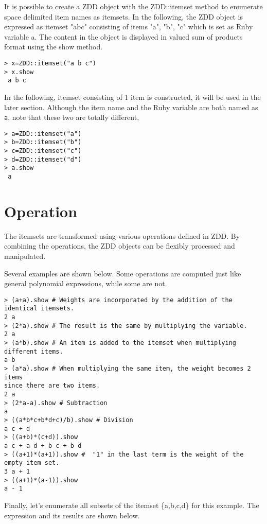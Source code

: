 It is possible to create a ZDD object with the ZDD::itemset method to enumerate space delimited item names as itemsets. In the following, the ZDD object is expressed as itemset "abc" consisting of items "a", "b", "c" which is set as Ruby variable a. The content in the object is displayed in valued sum of products format using the show method.

\begin{Verbatim}[baselinestretch=0.7,frame=single]
> x=ZDD::itemset("a b c")
> x.show
 a b c
\end{Verbatim}

In the following, itemset consisting of 1 item is constructed, it will be used in the later section. Although the item name and the Ruby variable are both named as \verb|a|,  note that these two are totally different, 

\begin{Verbatim}[baselinestretch=0.7,frame=single]
> a=ZDD::itemset("a")
> b=ZDD::itemset("b")
> c=ZDD::itemset("c")
> d=ZDD::itemset("d")
> a.show
 a
\end{Verbatim}

\section{Operation\label{sect:tut_ope}}
 The itemsets are transformed using various operations defined in ZDD. By combining the operations, the ZDD objects can be flexibly processed and manipulated. 
 
Several examples are shown below. Some operations are computed just like general polynomial expressions, while some are not.  

\begin{Verbatim}[baselinestretch=0.7,frame=single]
> (a+a).show # Weights are incorporated by the addition of the identical itemsets.
2 a
> (2*a).show # The result is the same by multiplying the variable.
2 a
> (a*b).show # An item is added to the itemset when multiplying different items.
a b
> (a*a).show # When multiplying the same item, the weight becomes 2 items 
since there are two items.
2 a
> (2*a-a).show # Subtraction
a
> ((a*b*c+b*d+c)/b).show # Division
a c + d
> ((a+b)*(c+d)).show
a c + a d + b c + b d 
> ((a+1)*(a+1)).show #  "1" in the last term is the weight of the empty item set.
3 a + 1
> ((a+1)*(a-1)).show
a - 1
\end{Verbatim}

Finally, let's enumerate all subsets of the itemset \{a,b,c,d\} for this example. 
The expression and its results are shown below.

